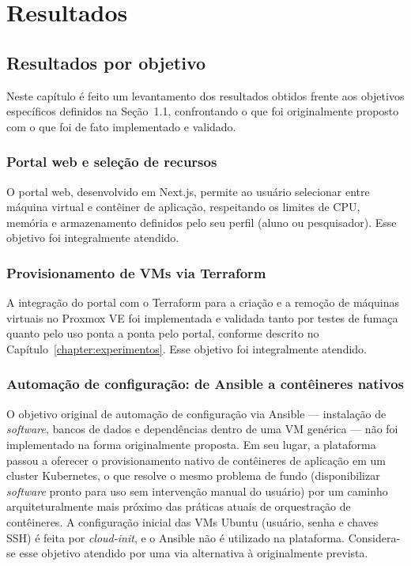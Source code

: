 \chapter{Resultados}
\label{chapter:resultados}

\section{Resultados por objetivo}

Neste capítulo é feito um levantamento dos resultados obtidos frente aos objetivos específicos definidos na Seção~1.1, confrontando o que foi originalmente proposto com o que foi de fato implementado e validado.

\subsection{Portal web e seleção de recursos}
O portal web, desenvolvido em Next.js, permite ao usuário selecionar entre máquina virtual e contêiner de aplicação, respeitando os limites de CPU, memória e armazenamento definidos pelo seu perfil (aluno ou pesquisador). Esse objetivo foi integralmente atendido.

\subsection{Provisionamento de VMs via Terraform}
A integração do portal com o Terraform para a criação e a remoção de máquinas virtuais no Proxmox VE foi implementada e validada tanto por testes de fumaça quanto pelo uso ponta a ponta pelo portal, conforme descrito no Capítulo~\ref{chapter:experimentos}. Esse objetivo foi integralmente atendido.

\subsection{Automação de configuração: de Ansible a contêineres nativos}
\label{sec:resultado_ansible}
O objetivo original de automação de configuração via Ansible — instalação de \textit{software}, bancos de dados e dependências dentro de uma VM genérica — não foi implementado na forma originalmente proposta. Em seu lugar, a plataforma passou a oferecer o provisionamento nativo de contêineres de aplicação em um cluster Kubernetes, o que resolve o mesmo problema de fundo (disponibilizar \textit{software} pronto para uso sem intervenção manual do usuário) por um caminho arquiteturalmente mais próximo das práticas atuais de orquestração de contêineres. A configuração inicial das VMs Ubuntu (usuário, senha e chaves SSH) é feita por \textit{cloud-init}, e o Ansible não é utilizado na plataforma. Considera-se esse objetivo atendido por uma via alternativa à originalmente prevista.

